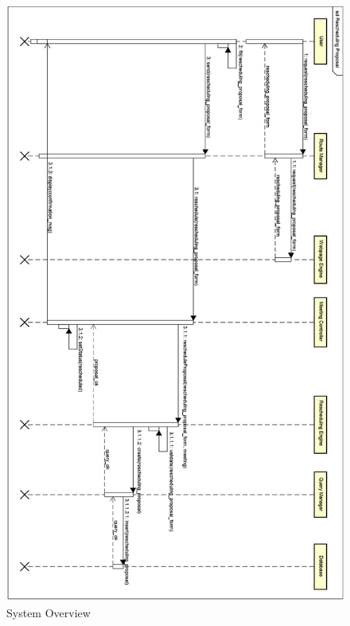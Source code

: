 \begin{figure}[h]
\centering\includegraphics[height = \textheight]{Images/RuntimeDiagrams/ReschedulingProposalOrizzontale.png}
\caption{System Overview}
\end{figure}
\clearpage